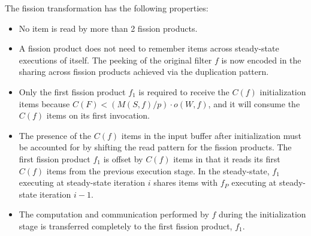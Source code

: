 The fission transformation has the following properties:
\begin{itemize}
\item No item is read by more than 2 fission products.
\item A fission product does not need to remember items across
  steady-state executions of itself. The peeking of the original
  filter $f$ is now encoded in the sharing across fission products
  achieved via the duplication pattern.
\item Only the first fission product $f_1$ is required to receive the $C(f)$
  initialization  items because $C(F) < (M(S,f) / p) \cdot o(W, f)$,
  and it will consume the $C(f)$ items on its first invocation.
\item The presence of the $C(f)$ items in the input buffer after
  initialization must be accounted for by shifting the read pattern
  for the fission products.  The first fission product $f_1$ is offset by
  $C(f)$ items in that it reads its first $C(f)$ items from the
  previous execution stage.  In the steady-state, $f_1$ executing at
  steady-state iteration $i$ shares items with $f_P$ executing at
  steady-state iteration $i-1$.
\item The computation and communication performed by $f$ during the
  initialization stage is transferred completely to the first fission
  product, $f_1$.  
\end{itemize}

 




